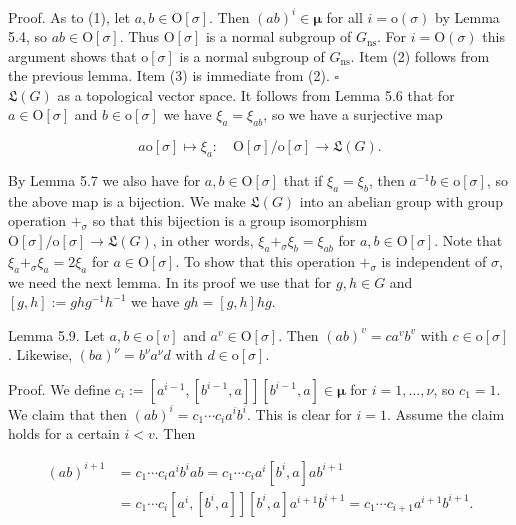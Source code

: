 \documentclass[10pt]{article}
\begin{document}
Proof. As to (1), let $a, b \in \mathrm{O}[\sigma]$. Then $(a b)^{i} \in \boldsymbol{\mu}$ for all $i=\mathrm{o}(\sigma)$ by Lemma 5.4, so $a b \in \mathrm{O}[\sigma]$. Thus $\mathrm{O}[\sigma]$ is a normal subgroup of $G_{\mathrm{ns}}$. For $i=\mathrm{O}(\sigma)$ this argument shows that $\mathrm{o}[\sigma]$ is a normal subgroup of $G_{\mathrm{ns}}$. Item (2) follows from the previous lemma. Item (3) is immediate from (2). \(\square\)\\
$\mathfrak{L}(G)$ as a topological vector space. It follows from Lemma 5.6 that for $a \in \mathrm{O}[\sigma]$ and $b \in \mathrm{o}[\sigma]$ we have $\xi_{a}=\xi_{a b}$, so we have a surjective map

$$
a \mathrm{o}[\sigma] \mapsto \xi_{a}: \quad \mathrm{O}[\sigma] / \mathrm{o}[\sigma] \rightarrow \mathfrak{L}(G) .
$$

By Lemma 5.7 we also have for $a, b \in \mathrm{O}[\sigma]$ that if $\xi_{a}=\xi_{b}$, then $a^{-1} b \in \mathrm{o}[\sigma]$, so the above map is a bijection. We make $\mathfrak{L}(G)$ into an abelian group with group operation $+_{\sigma}$ so that this bijection is a group isomorphism $\mathrm{O}[\sigma] / \mathrm{o}[\sigma] \rightarrow \mathfrak{L}(G)$, in other words, $\xi_{a}+_{\sigma} \xi_{b}=\xi_{a b}$ for $a, b \in \mathrm{O}[\sigma]$. Note that $\xi_{a}+_{\sigma} \xi_{a}=2 \xi_{a}$ for $a \in \mathrm{O}[\sigma]$. To show that this operation $+_{\sigma}$ is independent of $\sigma$, we need the next lemma. In its proof we use that for $g, h \in G$ and $[g, h]:=g h g^{-1} h^{-1}$ we have $g h=[g, h] h g$.

Lemma 5.9. Let $a, b \in \mathrm{o}[v]$ and $a^{v} \in \mathrm{O}[\sigma]$. Then $(a b)^{v}=c a^{v} b^{v}$ with $c \in \mathrm{o}[\sigma]$. Likewise, $(b a)^{\nu}=b^{\nu} a^{\nu} d$ with $d \in \mathrm{o}[\sigma]$.

Proof. We define $c_{i}:=\left[a^{i-1},\left[b^{i-1}, a\right]\right]\left[b^{i-1}, a\right] \in \boldsymbol{\mu}$ for $i=1, \ldots, \nu$, so $c_{1}=1$. We claim that then $(a b)^{i}=c_{1} \cdots c_{i} a^{i} b^{i}$. This is clear for $i=1$. Assume the claim holds for a certain $i<v$. Then

$$
\begin{aligned}
(a b)^{i+1} & =c_{1} \cdots c_{i} a^{i} b^{i} a b=c_{1} \cdots c_{i} a^{i}\left[b^{i}, a\right] a b^{i+1} \\
& =c_{1} \cdots c_{i}\left[a^{i},\left[b^{i}, a\right]\right]\left[b^{i}, a\right] a^{i+1} b^{i+1}=c_{1} \cdots c_{i+1} a^{i+1} b^{i+1} .
\end{aligned}
$$
\end{document}
